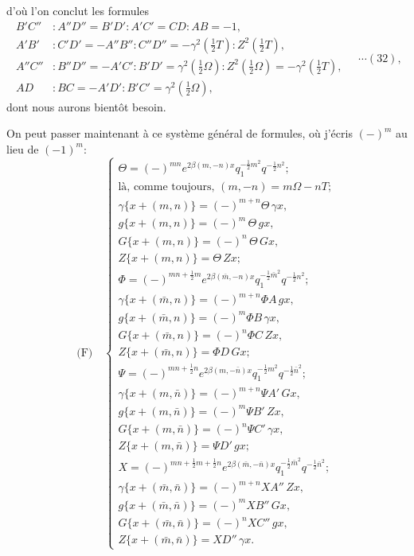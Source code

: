 \documentclass[12pt,a4paper]{article}
\begin{document}
\newpage
\setcounter{page}{170}

d'o\`u l'on conclut les formules
\[
\begin{aligned}
B'C'' &: A''D'' = B'D' : A'C' = CD : AB = -1,\\
A'B' &: C'D' = -A''B'' : C''D'' = -\gamma^2(\tfrac12 T) : Z^2(\tfrac12 T),\\
A''C'' &: B''D'' = -A'C' : B'D' = \gamma^2(\tfrac12\Omega) : Z^2(\tfrac12\Omega) = -\gamma^2(\tfrac12 T),\\
AD &: BC = -A'D' : B'C' = \gamma^2(\tfrac12\Omega),
\end{aligned}
\quad\cdots(32),
\]
dont nous aurons bient\^ot besoin.

On peut passer maintenant \`a ce syst\`eme g\'en\'eral de formules, o\`u j'\'ecris $(-)^m$ au lieu de $(-1)^m$:
\[
\text{(F)}\quad
\begin{cases}
\Theta = (-)^{mn}e^{2\beta(m, -n)x}q_1^{-\frac12 m^2}q^{-\frac12 n^2};\\[2pt]
\text{l\`a, comme toujours, }(m,-n) = m\Omega - nT;\\[4pt]
\gamma\{x + (m,n)\} = (-)^{m+n}\Theta\,\gamma x,\\
g\{x + (m,n)\} = (-)^{m}\,\Theta\,g x,\\
G\{x + (m,n)\} = (-)^{n}\,\Theta\,G x,\\
Z\{x + (m,n)\} = \Theta\,Z x;\\[6pt]
\Phi = (-)^{mn + \frac12 m}e^{2\beta(\bar m, -n)x}q_1^{-\frac12\bar m^2}q^{-\frac12 n^2};\\[2pt]
\gamma\{x + (\bar m,n)\} = (-)^{m+n}\Phi A\,g x,\\
g\{x + (\bar m,n)\} = (-)^{m}\Phi B\,\gamma x,\\
G\{x + (\bar m,n)\} = (-)^{n}\Phi C\,Z x,\\
Z\{x + (\bar m,n)\} = \Phi D\,G x;\\[6pt]
\Psi = (-)^{mn + \frac12 n}e^{2\beta(m, -\bar n)x}q_1^{-\frac12 m^2}q^{-\frac12\bar n^2};\\[2pt]
\gamma\{x + (m,\bar n)\} = (-)^{m+n}\Psi A'\,G x,\\
g\{x + (m,\bar n)\} = (-)^{m}\Psi B'\,Z x,\\
G\{x + (m,\bar n)\} = (-)^{n}\Psi C'\,\gamma x,\\
Z\{x + (m,\bar n)\} = \Psi D'\,g x;\\[6pt]
X = (-)^{mn + \frac12 m + \frac12 n}e^{2\beta(\bar m, -\bar n)x}q_1^{-\frac12\bar m^2}q^{-\frac12\bar n^2};\\[2pt]
\gamma\{x + (\bar m,\bar n)\} = (-)^{m+n}X A''\,Z x,\\
g\{x + (\bar m,\bar n)\} = (-)^{m}X B''\,G x,\\
G\{x + (\bar m,\bar n)\} = (-)^{n}X C''\,g x,\\
Z\{x + (\bar m,\bar n)\} = X D''\,\gamma x.
\end{cases}
\]
\end{document}
